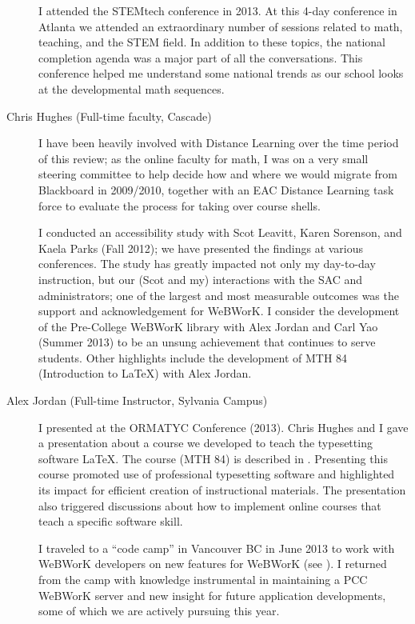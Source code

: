 \begin{description}
	I attended the STEMtech conference in 2013.  At this 4-day conference in
	Atlanta we attended an extraordinary number of sessions related to math,
	teaching, and the STEM field.  In addition to these topics, the national
	completion agenda was a major part of all the conversations.  This conference
	helped me understand some national trends as our school looks at the
	developmental math sequences.

	\item[Chris Hughes (Full-time faculty, Cascade)]
	I have been heavily involved with Distance Learning over the time period of
	this review; as the online faculty for math, I was on a very small steering
	committee to help decide how and where we would migrate from Blackboard in
	2009/2010, together with an EAC Distance Learning task force to evaluate the
	process for taking over course shells.

	I conducted an accessibility study with Scot Leavitt, Karen Sorenson, and Kaela
	Parks (Fall 2012); we have presented the findings at various conferences. The
	study has greatly impacted not only my day-to-day instruction, but our (Scot
	and my) interactions with the SAC and administrators; one of the largest and
	most measurable outcomes was the support and acknowledgement for WeBWorK. I
	consider the development of the Pre-College WeBWorK library with Alex Jordan
	and Carl Yao (Summer 2013) to be an unsung achievement that continues to serve
	students. Other highlights include the development of MTH 84 (Introduction to
	LaTeX) with Alex Jordan.

	\item[Alex Jordan (Full-time Instructor, Sylvania Campus)]
	I presented at the ORMATYC Conference (2013).  Chris Hughes and I gave a
	presentation about a course we developed to teach the typesetting software
	\LaTeX.  The course (MTH 84) is described in . Presenting
	this course promoted use of professional typesetting software and highlighted
	its impact for efficient creation of instructional materials. The presentation
	also triggered discussions about how to implement online courses that teach a
	specific software skill.

	I traveled to a ``code camp'' in Vancouver BC in June 2013 to work with WeBWorK
	developers on new features for WeBWorK (see ).  I returned
	from the camp with knowledge instrumental in maintaining a PCC WeBWorK server
	and new insight for future application developments, some of which we are
	actively pursuing this year.


\end{description}

